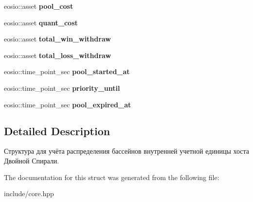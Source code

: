 \begin{DoxyCompactItemize}
eosio\+::asset {\bfseries pool\+\_\+cost}
\item 
\mbox{\label{structpool_a0cab32829724758ea9261e7c36e08339}} 
eosio\+::asset {\bfseries quant\+\_\+cost}
\item 
\mbox{\label{structpool_a72ce0339159c648358fb53a32a8c4c73}} 
eosio\+::asset {\bfseries total\+\_\+win\+\_\+withdraw}
\item 
\mbox{\label{structpool_a6ff847b127b7af06682f39c3ea147a59}} 
eosio\+::asset {\bfseries total\+\_\+loss\+\_\+withdraw}
\item 
\mbox{\label{structpool_afc0e41c1d7352dccf1988b31e5cdd7a1}} 
eosio\+::time\+\_\+point\+\_\+sec {\bfseries pool\+\_\+started\+\_\+at}
\item 
\mbox{\label{structpool_a91a910784f3c11a8941fd3c0afd9e9f2}} 
eosio\+::time\+\_\+point\+\_\+sec {\bfseries priority\+\_\+until}
\item 
\mbox{\label{structpool_a86f9ea628d7ee5ce4bc4e38f79d01b4b}} 
eosio\+::time\+\_\+point\+\_\+sec {\bfseries pool\+\_\+expired\+\_\+at}
\end{DoxyCompactItemize}


\subsection{Detailed Description}
Структура для учёта распределения бассейнов внутренней учетной единицы хоста Двойной Спирали. 

The documentation for this struct was generated from the following file\+:\begin{DoxyCompactItemize}
\item 
include/core.\+hpp\end{DoxyCompactItemize}
